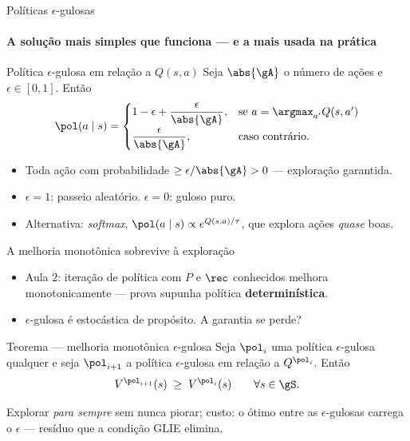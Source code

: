 \documentclass[aspectratio=169, 11pt]{beamer}
\begin{document}
\begin{frame}{Políticas $\epsilon$-gulosas}
  \framesubtitle{A solução mais simples que funciona --- e a mais usada na prática}

  \begin{defbox}{Política $\epsilon$-gulosa em relação a $Q(s,a)$}
    Seja $\abs{\gA}$ o número de ações e $\epsilon \in [0,1]$. Então
    \[
      \pol(a \mid s) =
      \begin{cases}
        1 - \epsilon + \dfrac{\epsilon}{\abs{\gA}}, & \text{se } a = \argmax_{a'} Q(s,a')\\[1.6ex]
        \dfrac{\epsilon}{\abs{\gA}}, & \text{caso contrário.}
      \end{cases}
    \]
  \end{defbox}

  \begin{itemize}\setlength{\itemsep}{0.3ex}
    \item Toda ação com probabilidade $\ge \epsilon/\abs{\gA} > 0$ —
      exploração garantida.
    \item $\epsilon = 1$: passeio aleatório. \quad $\epsilon = 0$: guloso puro.
    \item Alternativa: \emph{softmax}, $\pol(a\mid s) \propto e^{Q(s,a)/\tau}$,
      que explora ações \emph{quase} boas.
  \end{itemize}
\end{frame}

\begin{frame}{A melhoria monotônica sobrevive à exploração}

  \begin{itemize}\setlength{\itemsep}{0.35ex}
    \item Aula 2: iteração de política com $P$ e $\rec$ conhecidos melhora
      monotonicamente — prova supunha política \textbf{determinística}.
    \item $\epsilon$-gulosa é estocástica de propósito. A garantia se perde?
  \end{itemize}

  \begin{teobox}{Teorema — melhoria monotônica $\epsilon$-gulosa}
    Seja $\pol_i$ uma política $\epsilon$-gulosa qualquer e seja
    $\pol_{i+1}$ a política $\epsilon$-gulosa em relação a $Q^{\pol_i}$.
    Então
    \[ V^{\pol_{i+1}}(s) \;\ge\; V^{\pol_i}(s) \qquad \forall s \in \gS. \]
  \end{teobox}

  \vspace{-0.4em}
  \begin{ideiabox}
    Explorar \emph{para sempre} sem nunca piorar; custo: o ótimo entre as
    $\epsilon$-gulosas carrega o $\epsilon$ — resíduo que a condição GLIE
    elimina.
  \end{ideiabox}
\end{frame}
\end{document}
